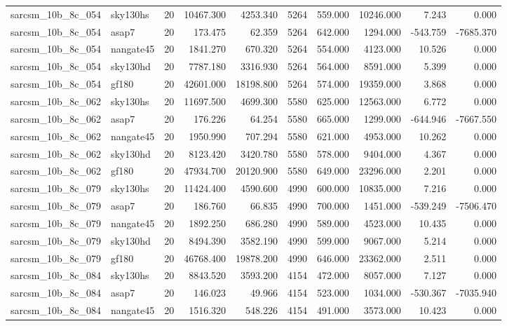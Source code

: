 \begin{longtable}{llrrrrrrrr}
sarcsm\_10b\_8c\_054 & sky130hs & 20 & 10467.300 & 4253.340 & 5264 & 559.000 & 10246.000 & 7.243 & 0.000 \\
sarcsm\_10b\_8c\_054 & asap7 & 20 & 173.475 & 62.359 & 5264 & 642.000 & 1294.000 & -543.759 & -7685.370 \\
sarcsm\_10b\_8c\_054 & nangate45 & 20 & 1841.270 & 670.320 & 5264 & 554.000 & 4123.000 & 10.526 & 0.000 \\
sarcsm\_10b\_8c\_054 & sky130hd & 20 & 7787.180 & 3316.930 & 5264 & 564.000 & 8591.000 & 5.399 & 0.000 \\
sarcsm\_10b\_8c\_054 & gf180 & 20 & 42601.000 & 18198.800 & 5264 & 574.000 & 19359.000 & 3.868 & 0.000 \\
sarcsm\_10b\_8c\_062 & sky130hs & 20 & 11697.500 & 4699.300 & 5580 & 625.000 & 12563.000 & 6.772 & 0.000 \\
sarcsm\_10b\_8c\_062 & asap7 & 20 & 176.226 & 64.254 & 5580 & 665.000 & 1299.000 & -644.946 & -7667.550 \\
sarcsm\_10b\_8c\_062 & nangate45 & 20 & 1950.990 & 707.294 & 5580 & 621.000 & 4953.000 & 10.262 & 0.000 \\
sarcsm\_10b\_8c\_062 & sky130hd & 20 & 8123.420 & 3420.780 & 5580 & 578.000 & 9404.000 & 4.367 & 0.000 \\
sarcsm\_10b\_8c\_062 & gf180 & 20 & 47934.700 & 20120.900 & 5580 & 649.000 & 23296.000 & 2.201 & 0.000 \\
sarcsm\_10b\_8c\_079 & sky130hs & 20 & 11424.400 & 4590.600 & 4990 & 600.000 & 10835.000 & 7.216 & 0.000 \\
sarcsm\_10b\_8c\_079 & asap7 & 20 & 186.760 & 66.835 & 4990 & 700.000 & 1451.000 & -539.249 & -7506.470 \\
sarcsm\_10b\_8c\_079 & nangate45 & 20 & 1892.250 & 686.280 & 4990 & 589.000 & 4523.000 & 10.435 & 0.000 \\
sarcsm\_10b\_8c\_079 & sky130hd & 20 & 8494.390 & 3582.190 & 4990 & 599.000 & 9067.000 & 5.214 & 0.000 \\
sarcsm\_10b\_8c\_079 & gf180 & 20 & 46768.400 & 19878.200 & 4990 & 646.000 & 23362.000 & 2.511 & 0.000 \\
sarcsm\_10b\_8c\_084 & sky130hs & 20 & 8843.520 & 3593.200 & 4154 & 472.000 & 8057.000 & 7.127 & 0.000 \\
sarcsm\_10b\_8c\_084 & asap7 & 20 & 146.023 & 49.966 & 4154 & 523.000 & 1034.000 & -530.367 & -7035.940 \\
sarcsm\_10b\_8c\_084 & nangate45 & 20 & 1516.320 & 548.226 & 4154 & 491.000 & 3573.000 & 10.423 & 0.000 \\

\end{longtable}
